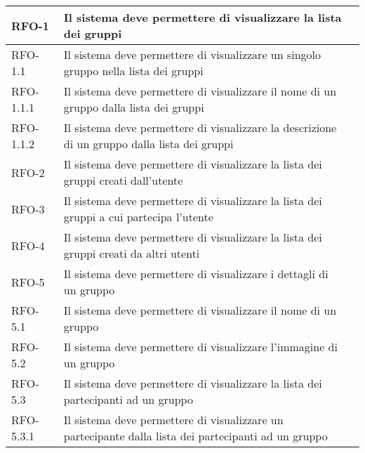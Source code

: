 \begin{center}
{\begin{longtable}{
        |>{\centering\arraybackslash}p{60pt}
        |>{\centering\arraybackslash}p{220pt}
        |>{\centering\arraybackslash}p{60pt}|}
        RFO-1     & Il sistema deve permettere di visualizzare la lista dei gruppi & \nameref{uc:scenario-visualizzazione-lista-gruppi} \\
        \hline
        RFO-1.1   & Il sistema deve permettere di visualizzare un singolo gruppo nella lista dei gruppi & \nameref{sub:visualizzazione-singolo-gruppo} \\
        \hline
        RFO-1.1.1   & Il sistema deve permettere di visualizzare il nome di un gruppo dalla lista dei gruppi & \nameref{subsub:visualizzazione-nome-gruppo} \\
        \hline
        RFO-1.1.2   & Il sistema deve permettere di visualizzare la descrizione di un gruppo dalla lista dei gruppi & \nameref{subsub:visualizzazione-descrizione-gruppo} \\
        \hline
        RFO-2     & Il sistema deve permettere di visualizzare la lista dei gruppi creati dall'utente & \nameref{uc:scenario-visualizzazione-lista-gruppi-creati}\\
        \hline
        RFO-3     & Il sistema deve permettere di visualizzare la lista dei gruppi  a cui partecipa l'utente & \nameref{uc:scenario-visualizzazione-lista-gruppi-partecipa}\\
        \hline
        RFO-4     & Il sistema deve permettere di visualizzare la lista dei gruppi creati da altri utenti & \nameref{uc:scenario-visualizzazione-lista-gruppi-altri}\\
        \hline
        RFO-5     & Il sistema deve permettere di visualizzare i dettagli di un gruppo & \nameref{uc:scenario-visualizzazione-dettaglio-gruppo}\\
        \hline
        RFO-5.1     & Il sistema deve permettere di visualizzare il nome di un gruppo & \nameref{sub:visualizzazione-nome-gruppo}\\
        \hline
        RFO-5.2     & Il sistema deve permettere di visualizzare l'immagine di un gruppo & \nameref{sub:visualizzazione-immagine-gruppo}\\
        \hline
        
        RFO-5.3     & Il sistema deve permettere di visualizzare la lista dei partecipanti ad un gruppo & \nameref{sub:visualizzazione-utenti-gruppo}\\
        \hline
        
        RFO-5.3.1     & Il sistema deve permettere di visualizzare un partecipante dalla lista dei partecipanti ad un gruppo & \nameref{subsub:visualizzazione-partecipanti-gruppo}\\
        \hline
        

\end{longtable}}
\end{center}
